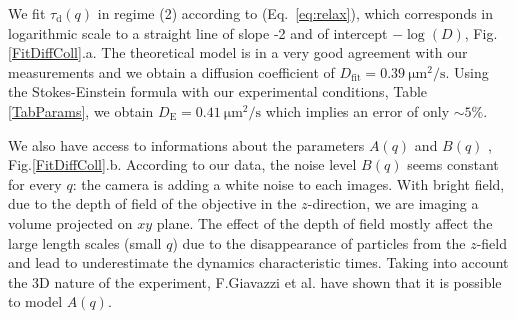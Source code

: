 \documentclass[%
 aip,
 jmp,%
 amsmath,amssymb,
reprint,%
]{revtex4-1}
\begin{document}
We fit $\tau_\text{d}(q)$ in regime (2) according to (Eq.~\ref{eq:relax}), which corresponds in logarithmic scale to a straight line of slope -2 and of intercept $-\log(D)$, Fig.\ref{FitDiffColl}.a. The theoretical model is in a very good agreement with our measurements and we obtain a diffusion coefficient of $D_\text{fit} = \SI{0.39}{\micro\meter\squared\per\second}$. Using the Stokes-Einstein formula with our experimental conditions, Table \ref{TabParams}, we obtain $D_\text{E} = \SI{0.41}{\micro\meter\squared\per\second}$ which implies an error of only $\sim 5 \%$. 


We also have access to informations about the parameters $A(q)$ and $B(q)$ , Fig.\ref{FitDiffColl}.b. According to our data, the noise level $B(q)$ seems constant for every $q$: the camera is adding a white noise to each images. With bright field, due to the depth of field of the objective in the $z$-direction, we are imaging a volume projected on $xy$ plane. The effect of the depth of field mostly affect the large length scales (small $q$) due to the disappearance of particles from the $z$-field and lead to underestimate the dynamics characteristic times\cite {4_Martinez20121637}. Taking into account the 3D nature of the experiment,  F.Giavazzi et al.\citep{3_DDM3D} have shown that it is possible to model $A(q)$.
\end{document}
